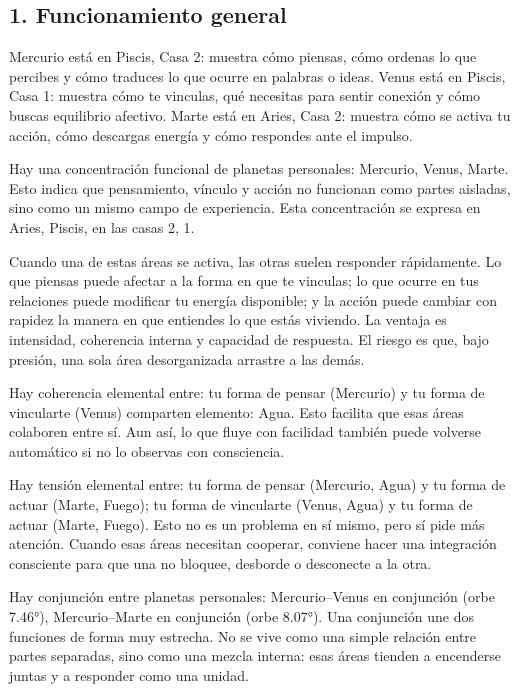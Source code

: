 \documentclass[11pt,a4paper]{article}
\begin{document}
\RaggedRight

\vspace{0.8cm}

\subsection{1. Funcionamiento general}

\RaggedRight
Mercurio está en Piscis, Casa 2: muestra cómo piensas, cómo ordenas lo que percibes y cómo traduces lo que ocurre en palabras o ideas.
Venus está en Piscis, Casa 1: muestra cómo te vinculas, qué necesitas para sentir conexión y cómo buscas equilibrio afectivo.
Marte está en Aries, Casa 2: muestra cómo se activa tu acción, cómo descargas energía y cómo respondes ante el impulso.

Hay una concentración funcional de planetas personales: Mercurio, Venus, Marte. Esto indica que pensamiento, vínculo y acción no funcionan como partes aisladas, sino como un mismo campo de experiencia. Esta concentración se expresa en Aries, Piscis, en las casas 2, 1.

Cuando una de estas áreas se activa, las otras suelen responder rápidamente. Lo que piensas puede afectar a la forma en que te vinculas; lo que ocurre en tus relaciones puede modificar tu energía disponible; y la acción puede cambiar con rapidez la manera en que entiendes lo que estás viviendo. La ventaja es intensidad, coherencia interna y capacidad de respuesta. El riesgo es que, bajo presión, una sola área desorganizada arrastre a las demás.

Hay coherencia elemental entre: tu forma de pensar (Mercurio) y tu forma de vincularte (Venus) comparten elemento: Agua. Esto facilita que esas áreas colaboren entre sí. Aun así, lo que fluye con facilidad también puede volverse automático si no lo observas con consciencia.

Hay tensión elemental entre: tu forma de pensar (Mercurio, Agua) y tu forma de actuar (Marte, Fuego); tu forma de vincularte (Venus, Agua) y tu forma de actuar (Marte, Fuego). Esto no es un problema en sí mismo, pero sí pide más atención. Cuando esas áreas necesitan cooperar, conviene hacer una integración consciente para que una no bloquee, desborde o desconecte a la otra.

Hay conjunción entre planetas personales: Mercurio–Venus en conjunción (orbe 7.46°), Mercurio–Marte en conjunción (orbe 8.07°). Una conjunción une dos funciones de forma muy estrecha. No se vive como una simple relación entre partes separadas, sino como una mezcla interna: esas áreas tienden a encenderse juntas y a responder como una unidad.
\end{document}
